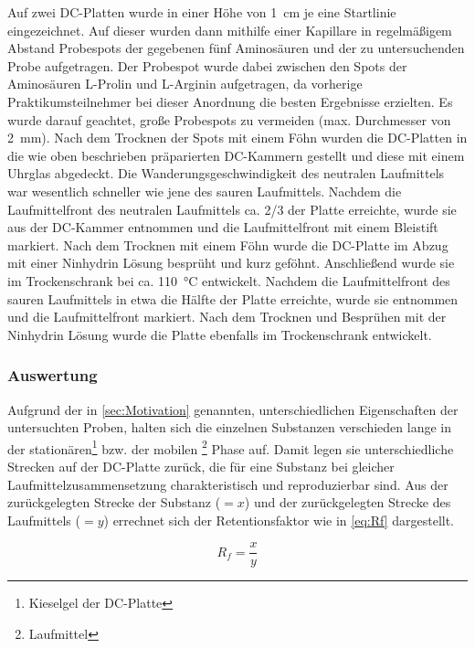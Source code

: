 \documentclass{article}
\begin{document}
        Auf zwei DC-Platten wurde in einer Höhe von \SI[mode=text]{1}{\centi\meter} je eine Startlinie eingezeichnet. Auf dieser wurden dann mithilfe einer Kapillare in regelmäßigem Abstand Probespots der gegebenen fünf Aminosäuren und der zu untersuchenden Probe aufgetragen. Der Probespot wurde dabei zwischen den Spots der Aminosäuren L-Prolin und L-Arginin aufgetragen, da vorherige Praktikumsteilnehmer bei dieser Anordnung die besten Ergebnisse erzielten. Es wurde darauf geachtet, große Probespots zu vermeiden (max. Durchmesser von \SI[mode=text]{2}{\milli\meter}). Nach dem Trocknen der Spots mit einem Föhn wurden die DC-Platten in die wie oben beschrieben präparierten DC-Kammern gestellt und diese mit einem Uhrglas abgedeckt. Die Wanderungsgeschwindigkeit des neutralen Laufmittels war wesentlich schneller wie jene des sauren Laufmittels. Nachdem die Laufmittelfront des neutralen Laufmittels ca. 2/3 der Platte erreichte, wurde sie aus der DC-Kammer entnommen und die Laufmittelfront mit einem Bleistift markiert. Nach dem Trocknen mit einem Föhn wurde die DC-Platte im Abzug mit einer Ninhydrin Lösung besprüht und kurz geföhnt. Anschließend wurde sie im Trockenschrank bei ca. \SI[mode=text]{110}{\degreeCelsius} entwickelt. Nachdem die Laufmittelfront des sauren Laufmittels in etwa die Hälfte der Platte erreichte, wurde sie entnommen und die Laufmittelfront markiert. Nach dem Trocknen und Besprühen mit der Ninhydrin Lösung wurde die Platte ebenfalls im Trockenschrank entwickelt.
    
      \subsubsection{Auswertung}
    
        Aufgrund der in \ref{sec:Motivation} genannten, unterschiedlichen Eigenschaften der untersuchten Proben, halten sich die einzelnen Substanzen verschieden lange in der stationären\footnote{Kieselgel der DC-Platte} bzw. der mobilen \footnote{Laufmittel} Phase auf. Damit legen sie unterschiedliche Strecken auf der DC-Platte zurück, die für eine Substanz bei gleicher Laufmittelzusammensetzung charakteristisch und reproduzierbar sind. Aus der zurückgelegten Strecke der Substanz ($= x$) und der zurückgelegten Strecke des Laufmittels ($= y$) errechnet sich der Retentionsfaktor wie in \eqref{eq:Rf} dargestellt.
    
        \begin{equation}
          R_{f} = \frac{x}{y} \label{eq:Rf}
        \end{equation}
        
\end{document}
